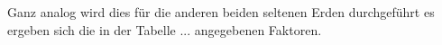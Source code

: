 Ganz analog wird dies für die anderen beiden seltenen Erden durchgeführt es ergeben sich die in der Tabelle ... angegebenen Faktoren.
